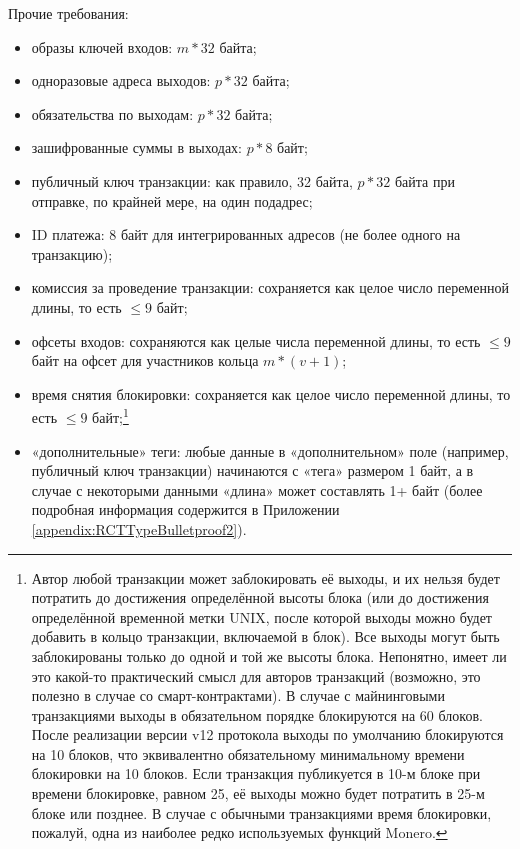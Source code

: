 Прочие требования:
\begin{itemize}
    \setlength\itemsep{\listspace}
    \item образы ключей входов: $m*32$ байта;
    \item одноразовые адреса выходов: $p*32$ байта;
    \item обязательства по выходам: $p*32$ байта;
    \item зашифрованные суммы в выходах: $p*8$ байт;
    \item публичный ключ транзакции: как правило, 32 байта, $p*32$ байта при отправке, по крайней мере, на один подадрес;
    \item ID платежа: 8 байт для интегрированных адресов (не более одного на транзакцию);
    \item комиссия за проведение транзакции: сохраняется как целое число переменной длины, то есть $\leq 9$ байт;
    \item офсеты входов: сохраняются как целые числа переменной длины, то есть $\leq 9$ байт на офсет для участников кольца $m*(v+1)$;
    \item время снятия блокировки: сохраняется как целое число переменной длины, то есть $\leq 9$ байт;\footnote{Автор любой транзакции может заблокировать её выходы, и их нельзя будет потратить до достижения определённой высоты блока (или до достижения определённой временной метки UNIX, после которой выходы можно будет добавить в кольцо транзакции, включаемой в блок). Все выходы могут быть заблокированы только до одной и той же высоты блока. Непонятно, имеет ли это какой-то практический смысл для авторов транзакций (возможно, это полезно в случае со смарт-контрактами). В случае с майнинговыми транзакциями выходы в обязательном порядке блокируются на 60 блоков. После реализации версии v12 протокола выходы по умолчанию блокируются на 10 блоков, что эквивалентно обязательному минимальному времени блокировки на 10 блоков. Если транзакция публикуется в 10-м блоке при времени блокировке, равном 25, её выходы можно будет потратить в 25-м блоке или позднее. В случае с обычными транзакциями время блокировки, пожалуй, одна из наиболее редко используемых функций Monero.}
    \item «дополнительные» теги: любые данные в «дополнительном» поле (например, публич\-ный ключ транзакции) начинаются с «тега» размером 1 байт, а в случае с некоторыми данными «длина» может составлять 1+ байт (более подробная информация содержится в Приложении \ref{appendix:RCTTypeBulletproof2}).
\end{itemize}